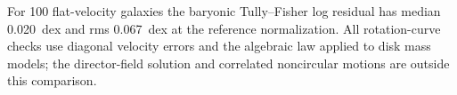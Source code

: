 For 100 flat-velocity galaxies the baryonic Tully--Fisher log residual has
median 0.020~dex and rms 0.067~dex at the reference normalization. All
rotation-curve checks use diagonal velocity errors and the algebraic law
applied to disk mass models; the director-field solution and correlated
noncircular motions are outside this comparison. 

